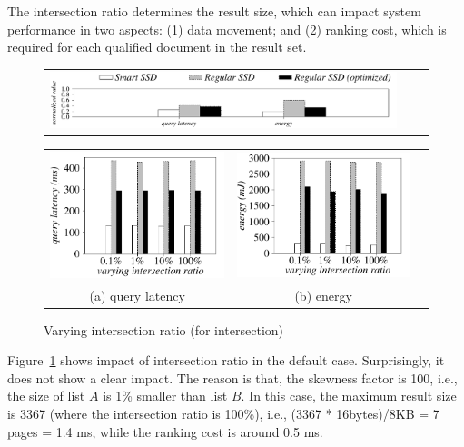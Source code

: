The intersection ratio determines the result size, which can impact system performance in two aspects: (1) data movement; and (2) ranking cost, which is required for each qualified document in the result set.

\begin{figure}[tbp]
\centering
\begin{tabular}{ccc}
\includegraphics[width=0.95\columnwidth]{figures/banner.pdf}
\end{tabular}
\renewcommand{\tabcolsep}{0.1mm}
\begin{tabular}{ccc}
\includegraphics[width=0.5\columnwidth]{figures/Intersection-time-VaryInterRatio-eps-converted-to.pdf}&
\includegraphics[width=0.5\columnwidth]{figures/Intersection-energy-VaryInterRatio-eps-converted-to.pdf}\\
(a) query latency & (b) energy
\end{tabular}
\caption{Varying intersection ratio (for intersection)}
\label{fig:varyInterRatioIntersection1}
\end{figure}

Figure~\ref{fig:varyInterRatioIntersection1} shows impact of intersection ratio in the default case. Surprisingly, it does not show a clear impact. The reason is that, the skewness factor is 100, i.e., the size of list $A$ is 1\% smaller than list $B$. In this case, the maximum result size is 3367 (where the intersection ratio is 100\%), i.e., (3367 * 16bytes)/8KB = 7 pages = 1.4 ms, while the ranking cost is around 0.5 ms.



